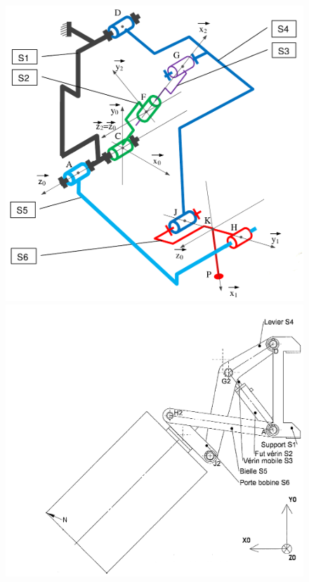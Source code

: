 \begin{figure}[!h]
 \begin{minipage}{0.4\linewidth}
  \centering\includegraphics[width=0.9\linewidth]{img/basculeur_cin.png}
 \end{minipage}
 \hfill
 \begin{minipage}{0.58\linewidth}
  \centering\includegraphics[width=0.9\linewidth]{img/basculeur_reduc.png}
 \end{minipage}
\end{figure}

